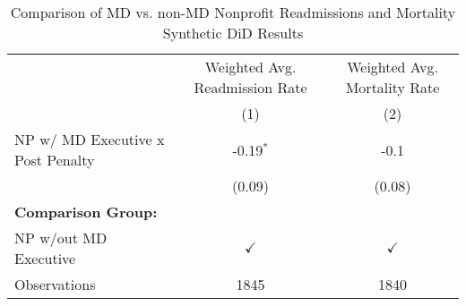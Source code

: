 \begin{table}[ht!]

\caption{\label{tab:MD_noMD_synth}Comparison of MD vs. non-MD Nonprofit Readmissions and Mortality Synthetic DiD Results}
\centering
\begin{tabular}[t]{lcc}
\toprule
\multicolumn{1}{c}{ } & \multicolumn{1}{c}{Weighted Avg. Readmission Rate} & \multicolumn{1}{c}{Weighted Avg. Mortality Rate} \\
\cmidrule(l{3pt}r{3pt}){2-2} \cmidrule(l{3pt}r{3pt}){3-3}
 & (1) & (2)\\
\midrule
NP w/ MD Executive x Post Penalty & -0.19$^{*}$ & -0.1\\
 & (0.09) & (0.08)\\
\textbf{Comparison Group:} &  & \\
NP w/out MD Executive & $\checkmark$ & $\checkmark$\\
Observations & 1845 & 1840\\
\bottomrule
\end{tabular}
\end{table}
